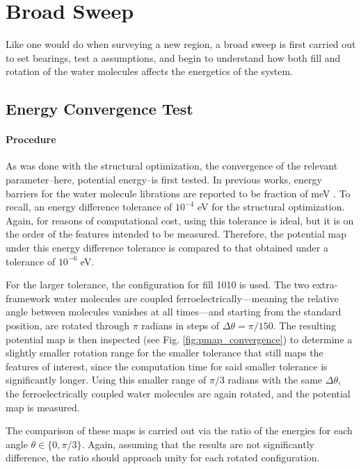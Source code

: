     \section{Broad Sweep}
    Like one would do when surveying a new region, a broad sweep is first carried out to set bearings, test a assumptions, and begin to understand how both fill and rotation of the water molecules affects the energetics of the system. 
        \subsection{Energy Convergence Test}
        \label{sec:en_conv_test}
        \paragraph{Procedure} As was done with the structural optimization, the convergence of the relevant parameter--here, potential energy--is first tested. In previous works, energy barriers for the water molecule librations are reported to be fraction of meV \cite{vibr_states}. To recall, an energy difference tolerance of $10^{-4}$ eV for the structural optimization. Again, for reasons of computational cost, using this tolerance is ideal, but it is on the order of the features intended to be measured. Therefore, the potential map under this energy difference tolerance is compared to that obtained under a tolerance of $10^{-6}$ eV. 
        
        For the larger tolerance, the configuration for fill 1010 is used. The two extra-framework water molecules are coupled ferroelectrically---meaning the relative angle between molecules vanishes at all times---and starting from the standard position, are rotated through $\pi$ radians in steps of $\Delta \theta = \pi/150$. The resulting potential map is then inspected (see Fig. \ref{fig:pmap_convergence}) to determine a slightly smaller rotation range for the smaller tolerance that still maps the features of interest, since the computation time for said smaller tolerance is significantly longer. Using this smaller range of $\pi/3$ radians with the same $\Delta \theta$, the ferroelectrically coupled water molecules are again rotated, and the potential map is measured.
        
        The comparison of these maps is carried out via the ratio of the energies for each angle $\theta \in \{0,\pi/3\}$. Again, assuming that the results are not significantly difference, the ratio should approach unity for each rotated configuration.
        
